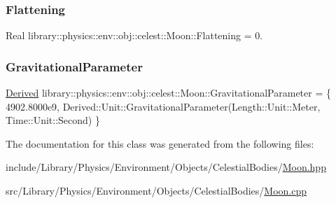 \subsubsection{\texorpdfstring{Flattening}{Flattening}}
{\footnotesize\ttfamily Real library\+::physics\+::env\+::obj\+::celest\+::\+Moon\+::\+Flattening = 0.\hspace{0.3cm}{\ttfamily [static]}}

\mbox{\label{classlibrary_1_1physics_1_1env_1_1obj_1_1celest_1_1_moon_a3ef853ee9345bbad3e58d7f0a9d14030}} 
\subsubsection{\texorpdfstring{Gravitational\+Parameter}{GravitationalParameter}}
{\footnotesize\ttfamily \hyperlink{classlibrary_1_1physics_1_1units_1_1_derived}{Derived} library\+::physics\+::env\+::obj\+::celest\+::\+Moon\+::\+Gravitational\+Parameter = \{ 4902.\+8000e9, Derived\+::\+Unit\+::\+Gravitational\+Parameter(\+Length\+::\+Unit\+::\+Meter, Time\+::\+Unit\+::\+Second) \}\hspace{0.3cm}{\ttfamily [static]}}



The documentation for this class was generated from the following files\+:\begin{DoxyCompactItemize}
\item 
include/\+Library/\+Physics/\+Environment/\+Objects/\+Celestial\+Bodies/\hyperlink{_moon_8hpp}{Moon.\+hpp}\item 
src/\+Library/\+Physics/\+Environment/\+Objects/\+Celestial\+Bodies/\hyperlink{_moon_8cpp}{Moon.\+cpp}\end{DoxyCompactItemize}

